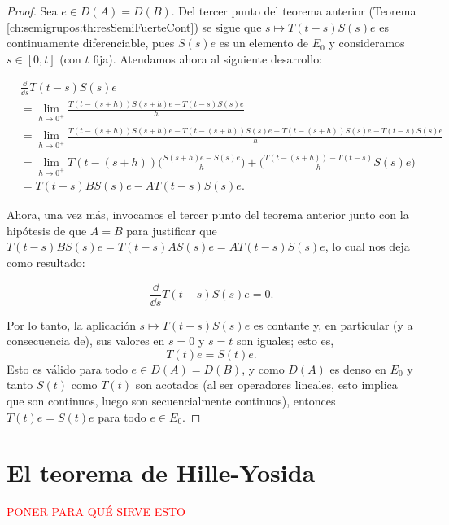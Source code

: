 \begin{proof}
    Sea $e \in D(A) = D(B)$. Del tercer punto del teorema anterior (Teorema \ref{ch:semigrupos:th:resSemiFuerteCont}) se sigue que $s \mapsto T(t-s)S(s)e$ es continuamente diferenciable, pues $S(s)e$ es un elemento de $E_0$ y consideramos $s \in [0, t]$ (con $t$ fija). Atendamos ahora al siguiente desarrollo:

    \begin{align*}
        &\frac{\dd}{\dd s}T(t-s)S(s)e\\
        &= \lim_{h \rightarrow 0^+} \frac{T(t-(s+h))S(s+h)e - T(t-s)S(s)e}{h}\\
        &= \lim_{h \rightarrow 0^+} \frac{T(t-(s+h))S(s+h)e - T(t - (s+h))S(s)e + T(t - (s+h))S(s)e - T(t-s)S(s)e}{h}\\
        &=\lim_{h \rightarrow 0^+} T(t-(s+h)) \Bigg ( \frac{S(s+h)e - S(s)e}{h} \Bigg ) + \Bigg(\frac{T(t-(s+h)) - T(t-s)}{h} S(s)e \Bigg )\\
        &=T(t-s)BS(s)e - AT(t-s)S(s)e.
    \end{align*}

    Ahora, una vez más, invocamos el tercer punto del teorema anterior junto con la hipótesis de que $A = B$ para justificar que $T(t-s)BS(s)e = T(t-s)AS(s)e = AT(t-s)S(s)e$, lo cual nos deja como resultado:

    \[\frac{\dd}{\dd s}T(t-s)S(s)e = 0.\]

    Por lo tanto, la aplicación $s \mapsto T(t-s)S(s)e$ es contante y, en particular (y a consecuencia de), sus valores en $s = 0$ y $s=t$ son iguales; esto es, \[T(t)e = S(t)e.\] Esto es válido para todo $e \in D(A) = D(B)$, y como $D(A)$ es denso en $E_0$ y tanto $S(t)$ como $T(t)$ son acotados (al ser operadores lineales, esto implica que son continuos, luego son secuencialmente continuos), entonces $T(t)e = S(t)e$ para todo $e \in E_0$.
\end{proof}

\section{El teorema de Hille-Yosida}
\label{ch:semigrupos:section:HilleYosida}

\textcolor{red}{PONER PARA QUÉ SIRVE ESTO}

